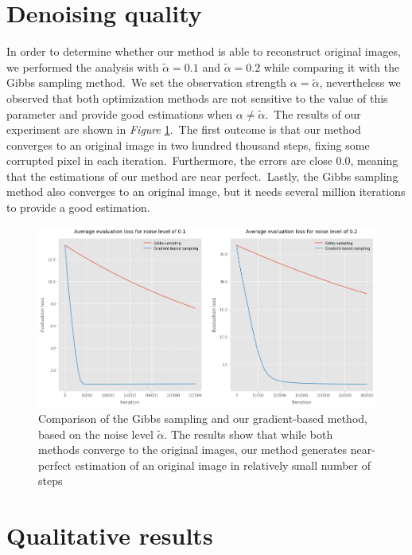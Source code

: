 \documentclass[shortabstract, english, lic]{iithesis}
\theoremstyle{default_theorem_style}\newtheorem{theorem}{Theorem}
\theoremstyle{default_theorem_style}\newtheorem{definition}{Definition}
\begin{document}
\section{Denoising quality}

In order to determine whether our method is able to reconstruct original images, we performed the analysis with
$\tilde{\alpha} = 0.1$ and $\tilde{\alpha} = 0.2$ while comparing it with the Gibbs sampling method.\ We set
the observation strength $\alpha = \tilde{\alpha}$, nevertheless we observed that both optimization methods are not
sensitive to the value of this parameter and provide good estimations when $\alpha \neq \tilde{\alpha}$.\ The
results of our experiment are shown in \textit{Figure} \ref{fig:grayscale_noise_level_plots}.\ The first outcome
is that our method converges to an original image in two hundred thousand steps, fixing some corrupted pixel in each
iteration.\ Furthermore, the errors are close $0.0$, meaning that the estimations of our method are near
perfect.\ Lastly, the Gibbs sampling method also converges to an original image, but it needs several million
iterations to provide a good estimation.\newline

\begin{figure}[H]
\centering
\includegraphics[scale=0.36]{grayscale_noise_level_plots}
\caption{Comparison of the Gibbs sampling and our gradient-based method, based on the noise level
$\tilde{\alpha}$. The results show that while both methods converge to the original images, our method generates
near-perfect estimation of an original image in relatively small number of steps}
\label{fig:grayscale_noise_level_plots}
\end{figure}

\section{Qualitative results}
\end{document}
